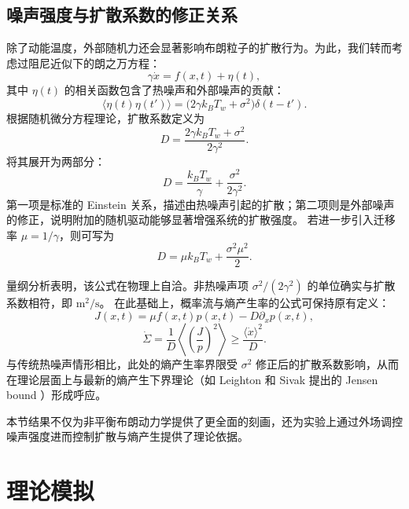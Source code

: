 \documentclass[a4paper]{report} %
\begin{document}
\section{噪声强度与扩散系数的修正关系}\par

除了动能温度，外部随机力还会显著影响布朗粒子的扩散行为。为此，我们转而考虑过阻尼近似下的朗之万方程：
\begin{equation}
\gamma \dot{x} = f(x,t) + \eta(t),
\end{equation}
其中 $\eta(t)$ 的相关函数包含了热噪声和外部噪声的贡献：
\begin{equation}
\langle \eta(t)\eta(t') \rangle = \big( 2\gamma k_B T_w + \sigma^2 \big)\delta(t-t').
\end{equation}
根据随机微分方程理论，扩散系数定义为
\begin{equation}
D = \frac{2\gamma k_B T_w + \sigma^2}{2\gamma^2}.
\end{equation}
将其展开为两部分：
\begin{equation}
D = \frac{k_B T_w}{\gamma} + \frac{\sigma^2}{2\gamma^2}.
\end{equation}
第一项是标准的 Einstein 关系，描述由热噪声引起的扩散；第二项则是外部噪声的修正，说明附加的随机驱动能够显著增强系统的扩散强度。
若进一步引入迁移率 $\mu = 1/\gamma$，则可写为
\begin{equation}
D = \mu k_B T_w + \frac{\sigma^2 \mu^2}{2}.
\end{equation}\par
量纲分析表明，该公式在物理上自洽。非热噪声项 $\sigma^2/(2\gamma^2)$ 的单位确实与扩散系数相符，即 $\mathrm{m^2/s}$。  
在此基础上，概率流与熵产生率的公式可保持原有定义：
\begin{equation}
J(x,t) = \mu f(x,t)p(x,t) - D \partial_x p(x,t),
\end{equation}
\begin{equation}
\dot{\Sigma} = \frac{1}{D} \left\langle \left( \frac{J}{p} \right)^2 \right\rangle \geq \frac{\langle \dot{x} \rangle^2}{D}.
\end{equation}
与传统热噪声情形相比，此处的熵产生率界限受 $\sigma^2$ 修正后的扩散系数影响，从而在理论层面上与最新的熵产生下界理论（如 Leighton 和 Sivak 提出的 Jensen bound \cite{Leighton2024}）形成呼应。\par  
本节结果不仅为非平衡布朗动力学提供了更全面的刻画，还为实验上通过外场调控噪声强度进而控制扩散与熵产生提供了理论依据。

\chapter{理论模拟}
\end{document}
